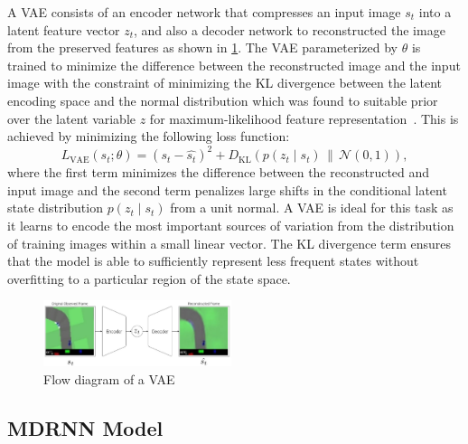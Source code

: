 A VAE consists of an encoder network that compresses an input image $s_t$ into a latent feature vector $z_t$, and also a decoder network to reconstructed the image from the preserved features as shown in \cref{fig:vae}. The VAE parameterized by $\theta$ is trained to minimize the difference between the reconstructed image and the input image with the constraint of minimizing the KL divergence between the latent encoding space and the normal distribution which was found to suitable prior over the latent variable $z$ for maximum-likelihood feature representation~\cite{diederik2014auto}. This is achieved by minimizing the following loss function: 
\begin{equation}
    L_{\mathrm{VAE}}(s_t;\theta) = (s_t - \hat{s_t})^2 + D_{\mathrm{KL}}(p(z_t \mid s_t)\,\|\,\mathcal{N}(0,1)),
\end{equation}
where the first term minimizes the difference between the reconstructed and input image and the second term penalizes large shifts in the conditional latent state distribution $p(z_t \mid s_t)$ from a unit normal. A VAE is ideal for this task as it learns to encode the most important sources of variation from the distribution of training images within a small linear vector. The KL divergence term ensures that the model is able to sufficiently represent less frequent states without overfitting to a particular region of the state space.
\begin{figure}[h]
	\centering
	\includegraphics[width=0.49\textwidth]{images/vaes.pdf}
	\caption{Flow diagram of a VAE \cite{ha2018recurrent}}\label{fig:vae}
\end{figure}

\subsection{MDRNN Model}

